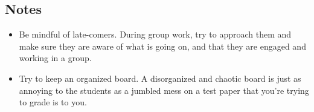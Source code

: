 \subsection*{Notes}
\begin{itemize}
	\item Be mindful of late-comers. During group work, try to approach them and make sure they are aware of what is going on, and that they are engaged and working in a group.
	\item Try to keep an organized board. A disorganized and chaotic board is just as annoying to the students as a jumbled mess on a test paper that you're trying to grade is to you.
\end{itemize}